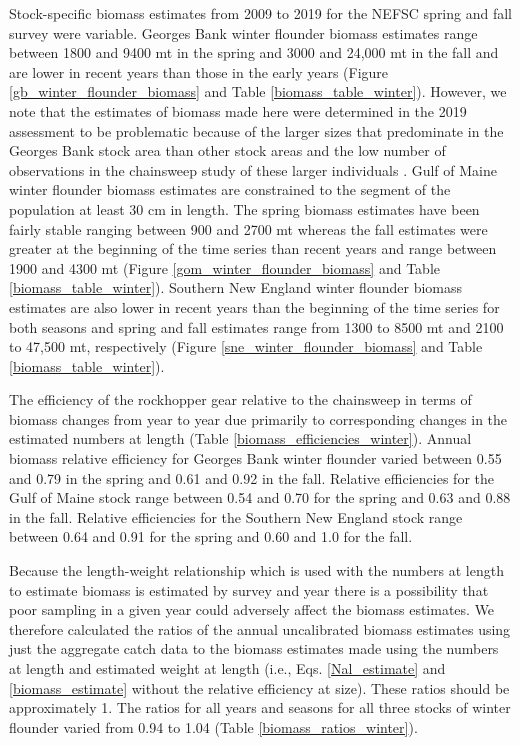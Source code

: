 \documentclass[12pt,letterpaper, leqno]{article}
\begin{document}
Stock-specific biomass estimates from 2009 to 2019 for the NEFSC spring and fall survey were variable. Georges Bank winter flounder biomass estimates range between 1800 and 9400 mt in the spring and 3000 and 24,000 mt in the fall and are lower in recent years than those in the early years (Figure \ref{gb_winter_flounder_biomass} and Table \ref{biomass_table_winter}). However, we note that the estimates of biomass made here were determined in the 2019 assessment to be problematic because of the larger sizes that predominate in the Georges Bank stock area than other stock areas and the low number of observations in the chainsweep study of these larger individuals \citep{nefsc2020}. Gulf of Maine winter flounder biomass estimates are constrained to the segment of the population at least 30 cm in length. The spring biomass estimates have been fairly stable ranging between 900 and 2700 mt whereas the fall estimates were greater at the beginning of the time series than recent years and range between 1900 and 4300 mt (Figure \ref{gom_winter_flounder_biomass} and Table \ref{biomass_table_winter}). Southern New England winter flounder biomass estimates are also lower in recent years than the beginning of the time series for both seasons and spring and fall estimates range from 1300 to 8500 mt and 2100 to 47,500 mt, respectively (Figure \ref{sne_winter_flounder_biomass} and Table \ref{biomass_table_winter}).

The efficiency of the rockhopper gear relative to the chainsweep in terms of biomass changes from year to year due primarily to corresponding changes in the estimated numbers at length (Table \ref{biomass_efficiencies_winter}). Annual biomass relative efficiency for Georges Bank winter flounder varied between 0.55 and 0.79 in the spring and 0.61 and 0.92 in the fall. Relative efficiencies for the Gulf of Maine stock range between 0.54 and 0.70 for the spring and 0.63 and 0.88 in the fall. Relative efficiencies for the Southern New England stock range between 0.64 and 0.91 for the spring and 0.60 and 1.0 for the fall.

Because the length-weight relationship which is used with the numbers at length to estimate biomass is estimated by survey and year there is a possibility that poor sampling in a given year could adversely affect the biomass estimates.  We therefore calculated the ratios of the annual uncalibrated biomass estimates using just the aggregate catch data to the biomass estimates made using the numbers at length and estimated weight at length (i.e., Eqs. \ref{Nal_estimate} and \ref{biomass_estimate} without the relative efficiency at size). These ratios should be approximately 1. The ratios for all years and seasons for all three stocks of winter flounder varied from 0.94 to 1.04 (Table \ref{biomass_ratios_winter}).
\end{document}

